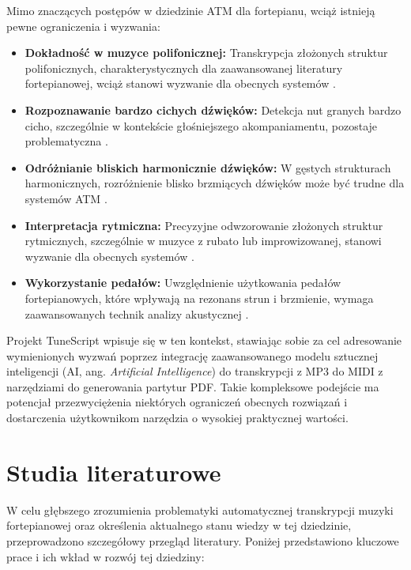 \documentclass[a4paper,twoside,12pt]{book}
\begin{document}
Mimo znaczących postępów w dziedzinie ATM dla fortepianu, wciąż istnieją pewne ograniczenia i wyzwania:

\begin{itemize}
	\item \textbf{Dokładność w muzyce polifonicznej:} Transkrypcja złożonych struktur polifonicznych, charakterystycznych dla zaawansowanej literatury fortepianowej, wciąż stanowi wyzwanie dla obecnych systemów \cite{bib:benetos2013automatic}.
	          
	\item \textbf{Rozpoznawanie bardzo cichych dźwięków:} Detekcja nut granych bardzo cicho, szczególnie w kontekście głośniejszego akompaniamentu, pozostaje problematyczna \cite{bib:sigtia2016end}.
	          
	\item \textbf{Odróżnianie bliskich harmonicznie dźwięków:} W gęstych strukturach harmonicznych, rozróżnienie blisko brzmiących dźwięków może być trudne dla systemów ATM \cite{bib:benetos2013automatic}.
	          
	\item \textbf{Interpretacja rytmiczna:} Precyzyjne odwzorowanie złożonych struktur rytmicznych, szczególnie w muzyce z rubato lub improwizowanej, stanowi wyzwanie dla obecnych systemów \cite{bib:cheng2016attack}.
	          
	\item \textbf{Wykorzystanie pedałów:} Uwzględnienie użytkowania pedałów fortepianowych, które wpływają na rezonans strun i brzmienie, wymaga zaawansowanych technik analizy akustycznej \cite{bib:cheng2016attack}.
\end{itemize}

Projekt TuneScript wpisuje się w ten kontekst, stawiając sobie za cel adresowanie wymienionych wyzwań poprzez integrację zaawansowanego modelu sztucznej inteligencji (AI, ang. \textit{Artificial Intelligence}) do transkrypcji z MP3 do MIDI z narzędziami do generowania partytur PDF. Takie kompleksowe podejście ma potencjał przezwyciężenia niektórych ograniczeń obecnych rozwiązań i dostarczenia użytkownikom narzędzia o wysokiej praktycznej wartości.

\section{Studia literaturowe}

W celu głębszego zrozumienia problematyki automatycznej transkrypcji muzyki fortepianowej oraz określenia aktualnego stanu wiedzy w tej dziedzinie, przeprowadzono szczegółowy przegląd literatury. Poniżej przedstawiono kluczowe prace i ich wkład w rozwój tej dziedziny:
\end{document}
